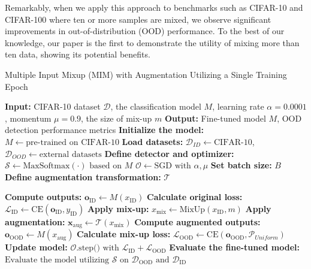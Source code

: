 \documentclass[letterpaper]{article} %
\begin{document}
Remarkably, when we apply this approach to benchmarks such as CIFAR-10 and CIFAR-100 where ten or more samples are mixed, we observe significant improvements in out-of-distribution (OOD) performance.
To the best of our knowledge, our paper is the first to demonstrate the utility of mixing more than ten data, showing its potential benefits.
\vspace{-0.1cm}
\begin{algorithm}
\caption{Multiple Input Mixup (MIM) with Augmentation Utilizing a Single Training Epoch}
\begin{algorithmic}[1]
\State \textbf{Input:} CIFAR-10 dataset $\mathcal{D}$, the classification model $M$, learning rate $\alpha = 0.0001$, momentum $\mu = 0.9$, the size of mix-up $m$
\State \textbf{Output:} Fine-tuned model $M$, OOD detection performance metrics
\State \textbf{Initialize the model:} $M \gets \text{pre-trained on CIFAR-10}$
\State \textbf{Load datasets:} 
\State \;\;\;$\mathcal{D}_{ID} \gets \text{CIFAR-10}$, $\mathcal{D}_{OOD} \gets \text{external datasets}$
\State \textbf{Define detector and optimizer:} 
\State \;\;\;$\mathcal{S} \gets \text{MaxSoftmax}(\cdot) \text{ based on } M$
\State \;\;\;$\mathcal{O} \gets \text{SGD with } \alpha, \mu$
\State \textbf{Set batch size:} $B$
\State \textbf{Define augmentation transformation:} $\mathcal{T}$

    \State \textbf{Compute outputs:} $\mathbf{o}_{\text{ID}} \gets M(x_{\text{ID}})$
    \State \textbf{Calculate original loss:} $\mathcal{L}_{\text{ID}} \gets \text{CE}(\mathbf{o}_{\text{ID}}, y_{\text{ID}})$
    \State \textbf{Apply mix-up:} $x_{\text{mix}} \gets \text{MixUp}(x_{\text{ID}}, m)$
    \State \textbf{Apply augmentation:} $\mathbf{x}_{\text{aug}} \gets \mathcal{T}(x_{\text{mix}})$
    \State \textbf{Compute augmented outputs:} $\mathbf{o}_{\text{OOD}} \gets M(x_{\text{aug}})$
    \State \textbf{Calculate mix-up loss:} 
    \State \;\;\;$\mathcal{L}_{\text{OOD}} \gets \text{CE}(\mathbf{o}_{\text{OOD}}, \mathcal{P}_{Uniform})$
    \State \textbf{Update model:} $\mathcal{O}.\text{step() with } \mathcal{L}_{\text{ID}} +\mathcal{L}_{\text{OOD}}$
\EndFor
\State \textbf{Evaluate the fine-tuned model:} 
\State \;\;\;$\text{Evaluate the model utilizing $\mathcal{S}$ on } \mathcal{D}_{\text{OOD}} \text{ and } \mathcal{D}_{\text{ID}}$
\end{algorithmic}
\end{algorithm}
\vspace{-0.1cm}
\end{document}
